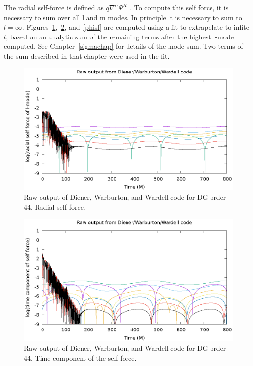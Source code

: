 The radial self-force is defined as $q\nabla^\alpha\Psi^{R}$~\cite{wardell_vega_thornberg_diener_worldtube_ylm_circularorbit}. To compute this self force, it is necessary to sum over all l and m modes. In principle it is necessary to sum to $l=\infty$. Figures~\ref{rsf},~\ref{tsf}, and~\ref{phisf} are computed using a fit to extrapolate to infite $l$, based on an analytic sum of the remaining terms after the highest l-mode computed. See Chapter~\ref{sigmachap} for details of the mode sum. Two terms of the sum described in that chapter were used in the fit.


\begin{figure}
  \includegraphics{rawRadialSelForceModes}
  \caption{Raw output of Diener, Warburton, and Wardell code for DG order 44. Radial self force.}
  \label{rsf}
\end{figure}

\begin{figure}
  \includegraphics{rawTimeSelfForceModes}
  \caption{Raw output of Diener, Warburton, and Wardell code for DG order 44. Time component of the self force.}
  \label{tsf}
\end{figure}

